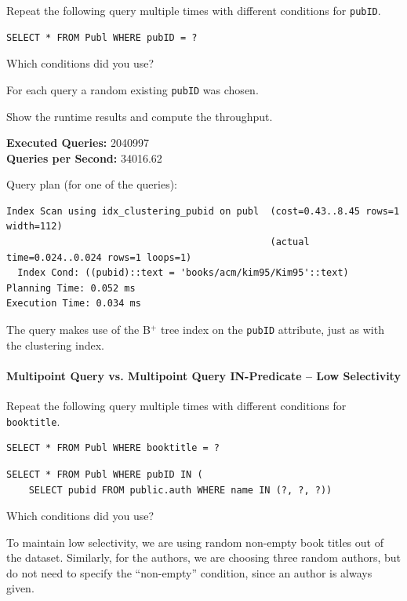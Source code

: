 \documentclass[11pt]{scrartcl}
\begin{document}
Repeat the following query multiple times with different conditions for \texttt{pubID}.

\begin{lstlisting}[style=dbtsql]
SELECT * FROM Publ WHERE pubID = ?
\end{lstlisting}

Which conditions did you use?

For each query a random existing \texttt{pubID} was chosen.

Show the runtime results and compute the throughput.

\textbf{Executed Queries: } 2040997\\
\textbf{Queries per Second: } 34016.62

Query plan (for one of the queries):

{\small
\parskip0pt\begin{verbatim}
Index Scan using idx_clustering_pubid on publ  (cost=0.43..8.45 rows=1 width=112)
                                               (actual time=0.024..0.024 rows=1 loops=1)
  Index Cond: ((pubid)::text = 'books/acm/kim95/Kim95'::text)
Planning Time: 0.052 ms
Execution Time: 0.034 ms
\end{verbatim}}
The query makes use of the B$^+$ tree index on the \texttt{pubID} attribute, just as with the clustering index.

\paragraph{Multipoint Query vs. Multipoint Query IN-Predicate -- Low Selectivity}

Repeat the following query multiple times with different conditions for \texttt{booktitle}.

\begin{lstlisting}[style=dbtsql]
SELECT * FROM Publ WHERE booktitle = ?
\end{lstlisting}

\begin{lstlisting}[style=dbtsql]
SELECT * FROM Publ WHERE pubID IN (
    SELECT pubid FROM public.auth WHERE name IN (?, ?, ?))
\end{lstlisting}


Which conditions did you use?

To maintain low selectivity, we are using random non-empty book titles out of the dataset.
Similarly, for the authors, we are choosing three random authors, but do not need to specify the \enquote{non-empty}
condition, since an author is always given.
\end{document}

